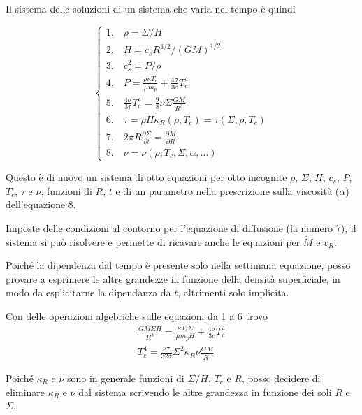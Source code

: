 \documentclass[a4paperbi]{article}
\begin{document}
	\newpage
	Il sistema delle soluzioni di un sistema che varia nel tempo è quindi
	
	\begin{spacing}{1.3}
	\begin{equation}
	\begin{cases}
		1.\quad \rho=\Sigma/H\\
		2.\quad H=c_sR^{3/2}/(GM)^{1/2}\\
		3.\quad c_s^2=P/\rho\\
		4.\quad P=\frac{\rho\kappa T_c}{\mu m_p}+\frac{4\sigma}{3c}T_c^4\\
		5.\quad \frac{4\sigma}{3\tau}T_c^4=\frac{9}{8}\nu\Sigma\frac{GM}{R^3}\\
		6.\quad \tau=\rho H\kappa_R(\rho,T_c)=\tau(\Sigma,\rho,T_c)\\
		7.\quad 2\pi R\frac{\partial \Sigma}{\partial t}=\frac{\partial\dot{M}}{\partial R}\\
		8.\quad \nu=\nu(\rho,T_c,\Sigma,\alpha,...)		
	\end{cases}
	\end{equation}
	\end{spacing}
	
	Questo è di nuovo un sistema di otto equazioni per otto incognite $\rho$, $\Sigma$, $H$, $c_s$, $P$, $T_c$, $\tau$ e $\nu$, funzioni di $R$, $t$ e di un parametro nella prescrizione sulla viscosità ($\alpha$) dell'equazione 8. 
	
	Imposte delle condizioni al contorno per l'equazione di diffusione (la numero 7), il sistema si può risolvere e permette di ricavare anche le equazioni per $\dot{M}$ e $v_R$.
	
	Poiché la dipendenza dal tempo è presente solo nella settimana equazione, posso provare a esprimere le altre grandezze in funzione della densità superficiale, in modo da esplicitarne la dipendanza da $t$, altrimenti solo implicita.
	
	Con delle operazioni algebriche sulle equazioni da 1 a 6 trovo
	\begin{gather}
		\frac{GM\Sigma H}{R^3}=\frac{\kappa T_c\Sigma}{\mu m_p H}+\frac{4\sigma}{3c}T_c^4\\
		T^4_c=\frac{27}{32\sigma}\Sigma^2\kappa_R\nu\frac{GM}{R^3}
	\end{gather}
	
	Poiché $\kappa_R$ e $\nu$ sono in generale funzioni di $\Sigma/H$, $T_c$ e $R$, posso decidere di eliminare $\kappa_R$ e $\nu$ dal sistema scrivendo le altre grandezza in funzione dei soli $R$ e $\Sigma$.
		
\end{document}
